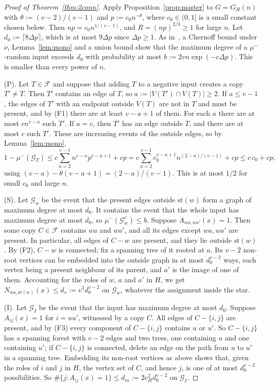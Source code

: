\documentclass[11pt]{article}
\theoremstyle{remark}
\newcommand{\Fam}{\mathcal{F}}
\newcommand{\st}{\mathrm{st}}
\newcommand{\abs}[1]{\lvert #1\rvert}
\newcommand{\Ev}{\mathcal{G}}
\begin{document}
\begin{proof}[Proof of Theorem~\ref{thm:2conn}]
Apply Proposition~\ref{prop:master} to $G=G_H(n)$ with $\theta:=(v-2)/(v-1)$ and $p:=c_0n^{-\theta}$, where $c_0\in(0,1]$ is a small constant chosen below. Then $np=c_0n^{1/(v-1)}$, and $R=(np)^{2/3}\ge1$ for large $n$. Let $d_0:=\lceil8\Delta p\rceil$, which is at most $9\Delta p$ since $\Delta p\ge1$. As in~\cite[(5.17)]{CGZ26}, a Chernoff bound under $\nu$, Lemma~\ref{lem:mono} and a union bound show that the maximum degree of a $\mu^-$-random input exceeds $d_0$ with probability at most $b:=2vn\exp(-c\Delta p)$. This is smaller than every power of $n$.

(P). Let $T\in\Fam$ and suppose that adding $T$ to a negative input creates a copy $T'\ne T$. Then $T'$ contains an edge of $T$, so $a:=\abs{V(T')\cap V(T)}\ge2$. If $a\le v-1$, the edges of $T'$ with an endpoint outside $V(T)$ are not in $T$ and must be present, and by (F1) there are at least $v-a+1$ of them. For each $a$ there are at most $cn^{v-a}$ such $T'$. If $a=v$, then $T'$ has an edge outside $T$, and there are at most $c$ such $T'$. These are increasing events of the outside edges, so by Lemma~\ref{lem:mono},
\[1-\mu^-(\Ev_T)\le c\sum_{a=2}^{v-1}n^{v-a}p^{v-a+1}+cp=c\sum_{a=2}^{v-1}c_0^{v-a+1}n^{(2-a)/(v-1)}+cp\le c\,c_0+cp,\]
using $(v-a)-\theta(v-a+1)=(2-a)/(v-1)$. This is at most $1/2$ for small $c_0$ and large $n$.

(S). Let $\Ev_w$ be the event that the present edges outside $\st(w)$ form a graph of maximum degree at most $d_0$. It contains the event that the whole input has maximum degree at most $d_0$, so $\mu^-(\Ev_w^c)\le b$. Suppose $A_{wa,wa'}(x)=1$. Then some copy $C\in\Fam$ contains $wa$ and $wa'$, and all its edges except $wa,wa'$ are present. In particular, all edges of $C-w$ are present, and they lie outside $\st(w)$. By (F2), $C-w$ is connected; fix a spanning tree of it rooted at $a$. Its $v-2$ non-root vertices can be embedded into the outside graph in at most $d_0^{v-2}$ ways, each vertex being a present neighbour of its parent, and $a'$ is the image of one of them. Accounting for the roles of $w$, $a$ and $a'$ in $H$, we get $N_{wa,\st(w)}(x)\le d_s:=v^3d_0^{v-2}$ on $\Ev_w$, whatever the assignment inside the star.

(I). Let $\Ev_I$ be the event that the input has maximum degree at most $d_0$. Suppose $A_{ij}(x)=1$ for $i=uu'$, witnessed by a copy $C$. All edges of $C-\{i,j\}$ are present, and by (F3) every component of $C-\{i,j\}$ contains $u$ or $u'$. So $C-\{i,j\}$ has a spanning forest with $v-2$ edges and two trees, one containing $u$ and one containing $u'$; if $C-\{i,j\}$ is connected, delete an edge on the path from $u$ to $u'$ in a spanning tree. Embedding its non-root vertices as above shows that, given the roles of $i$ and $j$ in $H$, the vertex set of $C$, and hence $j$, is one of at most $d_0^{v-2}$ possibilities. So $\#\{j:A_{ij}(x)=1\}\le d_m:=2e_H^2d_0^{v-2}$ on $\Ev_I$.


\end{proof}
\end{document}
